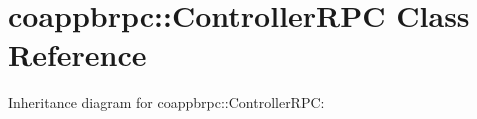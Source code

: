 \hypertarget{classcoappbrpc_1_1ControllerRPC}{}\section{coappbrpc\+:\+:Controller\+R\+PC Class Reference}
\label{classcoappbrpc_1_1ControllerRPC}


Inheritance diagram for coappbrpc\+:\+:Controller\+R\+PC\+:
